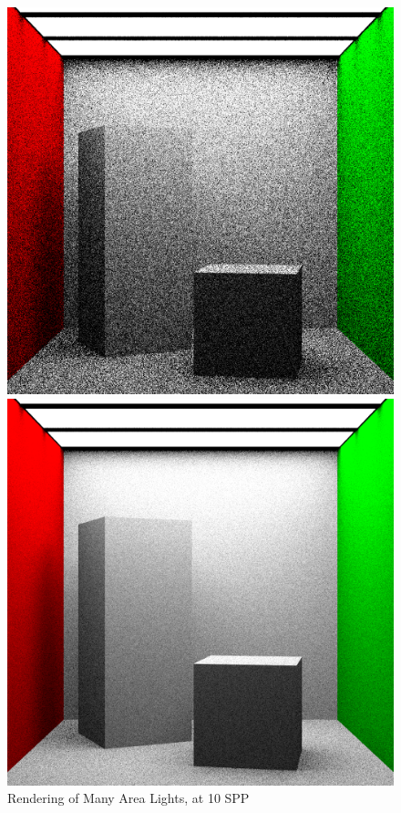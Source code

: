 \documentclass[a4paper]{myarticle}
\begin{document}
\begin{figure}[H]
  \begin{minipage}[t]{.3\textwidth}
      \centering
      \includegraphics[width=\textwidth]{q3/many_0_10.png}
      \caption{Rendering of Many Area Lights, at 10 SPP}
  \end{minipage}
  \hfill
  \begin{minipage}[t]{.3\textwidth}
      \centering
      \includegraphics[width=\textwidth]{q3/many_0_100.png}

\end{minipage}
\end{figure}
\end{document}
